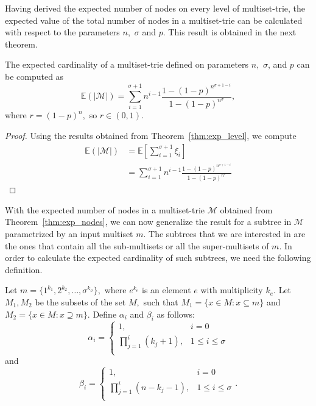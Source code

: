 \documentclass[algorithms,article,accept,pdftex,moreauthors]{Definitions/mdpi}
\begin{document}
Having derived the expected number of nodes on every level of multiset-trie, the
expected value of the total number of nodes in a multiset-trie can be calculated 
with respect to the parameters $n,$ $\sigma$ and $p.$ This result is obtained in 
the next theorem.

\begin{Theorem}\label{thm:exp_nodes}
The expected cardinality of a multiset-trie defined on parameters $n,$ $\sigma$, 
and $p$ can be computed as 
\begin{equation}
\mathbb{E}( | \mathcal{M} | ) = \sum_{i=1}^{\sigma+1} n^{i-1} \frac{1-(1-p)^{n^{\sigma +1 -i}}}{1-(1-p)^{n^{\sigma}}},
\end{equation}
where $r = (1-p)^n,$ so $r\in(0,1).$
\end{Theorem}
\begin{proof}
Using the results obtained from Theorem~\ref{thm:exp_level}, we compute 
\begin{align*}
\mathbb{E}( | \mathcal{M} | ) &= \mathbb{E}\left[ \sum_{i=1}^{\sigma+1} \xi_i \right] \\
&= \sum_{i=1}^{\sigma + 1} n^{i-1} \frac{1-(1-p)^{n^{\sigma + 1 -i}}}{1-(1-p)^{n^{\sigma}}}
\end{align*}
\end{proof}

With the expected number of nodes in a multiset-trie $\mathcal{M}$ obtained from 
Theorem~\ref{thm:exp_nodes}, we can now generalize the result for a subtree 
in $\mathcal{M}$ parametrized by an input multiset $m.$ The subtrees that we 
are interested in are the ones that contain all the sub-multisets or all the 
super-multisets of $m.$ In order to calculate the expected cardinality of such 
subtrees, we need the following definition. 

\begin{Definition}\label{def:params}
Let $m = \{ 1^{k_1}, 2^{k_2}, \ldots, \sigma^{k_\sigma} \},$ where 
$e^{k_e}$ is an element $e$ with multiplicity $k_e.$ Let $M_1, M_2$ be 
the subsets of the set $M,$ such that $M_1 = \{ x\in M : x\subseteq m \}$ and 
$M_2 = \{ x\in M : x\supseteq m \}.$
Define $\alpha_i$ and $\beta_i$ as follows: 
\begin{equation*}
\alpha_i = \begin{cases}
1, & i=0 \\
\prod_{j=1}^i (k_j+1), & 1\leq i\leq\sigma \\
\end{cases}
\end{equation*} 
and 
\begin{equation*}
\beta_i = \begin{cases}
1, & i=0 \\
\prod_{j=1}^i (n-k_j-1), & 1\leq i\leq\sigma \\
\end{cases}.
\end{equation*}
\end{Definition}
\end{document}

